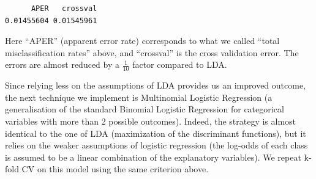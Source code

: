 \documentclass[
  letterpaper,
  DIV=11,
  numbers=noendperiod]{scrartcl}
\newenvironment{Shaded}{\begin{snugshade}}{\end{snugshade}}
\newcommand{\AttributeTok}[1]{\textcolor[rgb]{0.40,0.45,0.13}{#1}}
\newcommand{\ConstantTok}[1]{\textcolor[rgb]{0.56,0.35,0.01}{#1}}
\newcommand{\DecValTok}[1]{\textcolor[rgb]{0.68,0.00,0.00}{#1}}
\newcommand{\FunctionTok}[1]{\textcolor[rgb]{0.28,0.35,0.67}{#1}}
\newcommand{\NormalTok}[1]{\textcolor[rgb]{0.00,0.23,0.31}{#1}}
\newcommand{\OtherTok}[1]{\textcolor[rgb]{0.00,0.23,0.31}{#1}}
\newcommand{\SpecialCharTok}[1]{\textcolor[rgb]{0.37,0.37,0.37}{#1}}
\begin{document}
\begin{Shaded}
\end{Shaded}

\begin{verbatim}
      APER   crossval 
0.01455604 0.01545961 
\end{verbatim}

Here ``APER'' (apparent error rate) corresponds to what we called
``total misclassification rates'' above, and ``crossval'' is the cross
validation error. The errors are almost reduced by a \(\frac{1}{10}\)
factor compared to LDA.

Since relying less on the assumptions of LDA provides us an improved
outcome, the next technique we implement is Multinomial Logistic
Regression (a generalisation of the standard Binomial Logistic
Regression for categorical variables with more than 2 possible
outcomes). Indeed, the strategy is almost identical to the one of LDA
(maximization of the discriminant functions), but it relies on the
weaker assumptions of logistic regression (the log-odds of each class is
assumed to be a linear combination of the explanatory variables). We
repeat k-fold CV on this model using the same criterion above.
\end{document}
